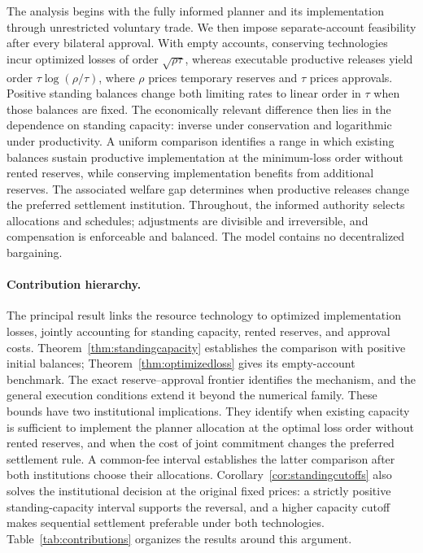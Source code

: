 \documentclass[ecta,draft]{econsocart}
\theoremstyle{definition}
\theoremstyle{definition}
\begin{document}
The analysis begins with the fully informed planner and its implementation
through unrestricted voluntary trade. We then impose separate-account
feasibility after every bilateral approval. With empty accounts, conserving
technologies incur optimized losses of order $\sqrt{\rho\tau}$, whereas
executable productive releases yield order $\tau\log(\rho/\tau)$, where
$\rho$ prices temporary reserves and $\tau$ prices approvals. Positive
standing balances change both limiting rates to linear order in $\tau$ when
those balances are fixed. The economically relevant difference then lies in
the dependence on standing capacity: inverse under conservation and
logarithmic under productivity. A uniform comparison identifies a range in
which existing balances sustain productive implementation at the minimum-loss
order without rented reserves, while conserving implementation benefits from
additional reserves. The associated welfare gap determines when productive
releases change the preferred settlement institution. Throughout, the informed
authority selects allocations and schedules; adjustments are divisible and
irreversible, and compensation is enforceable and balanced. The model contains
no decentralized bargaining.

\paragraph{Contribution hierarchy.}
The principal result links the resource technology to optimized implementation
losses, jointly accounting for standing capacity, rented reserves, and approval
costs. Theorem~\ref{thm:standingcapacity} establishes the comparison with
positive initial balances; Theorem~\ref{thm:optimizedloss} gives its
empty-account benchmark. The exact reserve--approval frontier identifies the
mechanism, and the general execution conditions extend it beyond the numerical
family. These bounds have two institutional implications. They identify when
existing capacity is sufficient to implement the planner allocation at the optimal loss order
without rented reserves, and when the cost of joint commitment changes the
preferred settlement rule. A common-fee interval establishes the latter
comparison after both institutions choose their allocations.
Corollary~\ref{cor:standingcutoffs} also solves the institutional decision
at the original fixed prices: a strictly positive standing-capacity interval
supports the reversal, and a higher capacity cutoff makes sequential
settlement preferable under both technologies. Table~\ref{tab:contributions} organizes the results around this argument.
\end{document}
